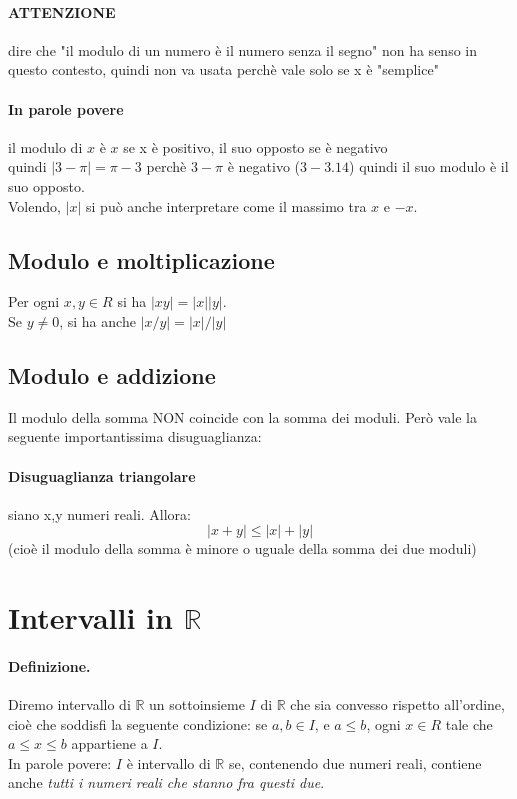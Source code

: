 \documentclass[12pt, a4paper, openany]{book}
\begin{document}
\paragraph{ATTENZIONE} dire che "il modulo di un numero è il numero senza il segno" non ha senso in questo contesto, quindi non va usata perchè vale solo se x è "semplice"
\paragraph{In parole povere} il modulo di $x$ è $x$ se x è positivo, il suo opposto se è negativo\\
quindi $|3 - \pi| = \pi - 3$ perchè $3-\pi$ è negativo ($3 - 3.14$) quindi il suo modulo è il suo opposto.
\\Volendo, $|x|$ si può anche interpretare come il massimo tra $x$ e $-x$.
\subsection{Modulo e moltiplicazione}
Per ogni $x, y \in R$ si ha $|xy| = |x||y|$.\\Se $y\neq0$, si ha anche $|x/y|=|x|/|y|$
\subsection{Modulo e addizione}
Il modulo della somma NON coincide con la somma dei moduli. Però vale la seguente importantissima disuguaglianza:
\paragraph{Disuguaglianza triangolare} siano x,y numeri reali. Allora:
\begin{equation}
    |x+y| \leq |x| + |y|
\end{equation} 
(cioè il modulo della somma è minore o uguale della somma dei due moduli)

\section{Intervalli in $\mathbb{R}$}
\paragraph{Definizione.} Diremo intervallo di $\mathbb{R}$ un sottoinsieme $I$ di $\mathbb{R}$ che sia convesso rispetto all'ordine, cioè che soddisfi la seguente condizione: se $a,b \in I$, e $a \leq b$, ogni $x\in R$ tale che $a \leq x \leq b$ appartiene a $I$. 
\\In parole povere: $I$ è intervallo di $\mathbb{R}$ se, contenendo due numeri reali, contiene anche \emph{tutti i numeri reali che stanno fra questi due}.
\end{document}
